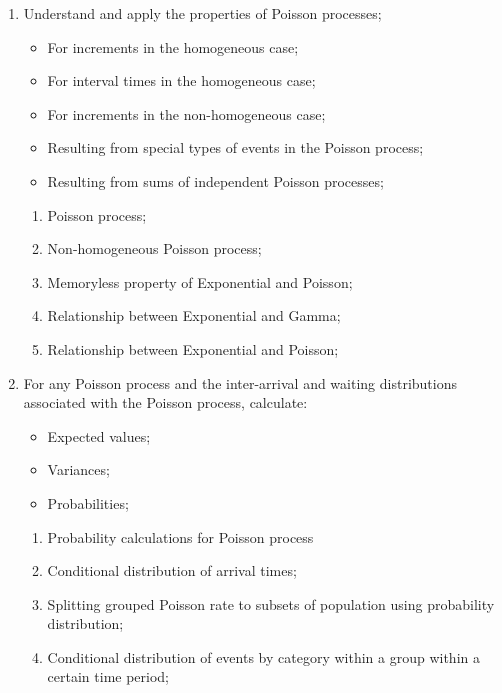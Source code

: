 \documentclass[12pt, titlepage, french]{report}
\begin{document}
\begin{outcomes}
\begin{enumerate}
	\item	Understand and apply the properties of Poisson processes;
		\begin{itemize}
		\item	For increments in the homogeneous case;
		\item	For interval times in the homogeneous case;
		\item	For increments in the non-homogeneous case;
		\item	Resulting from special types of events in the Poisson process;
		\item	Resulting from sums of independent Poisson processes;
		\end{itemize}
	\begin{knowledge}
	\begin{enumerate}[label = \alph*.]
		\item	Poisson process;
		\item	Non-homogeneous Poisson process;
		\item	Memoryless property of Exponential and Poisson;
		\item	Relationship between Exponential and Gamma;
		\item	Relationship between Exponential and Poisson;
	\end{enumerate}
	\end{knowledge}
\tcbline
	\item	For any Poisson process and the inter-arrival and waiting distributions associated with the Poisson process, calculate:
		\begin{itemize}
		\item	Expected values;
		\item	Variances;
		\item	Probabilities;
		\end{itemize}
	\begin{knowledge}
	\begin{enumerate}[label = \alph*.]
		\item	Probability calculations for Poisson process
		\item	Conditional distribution of arrival times;
		\item	Splitting grouped Poisson rate to subsets of population using probability distribution;
		\item	Conditional distribution of events by category within a group within a certain time period;

\end{enumerate}
\end{knowledge}
\end{enumerate}
\end{outcomes}
\end{document}
